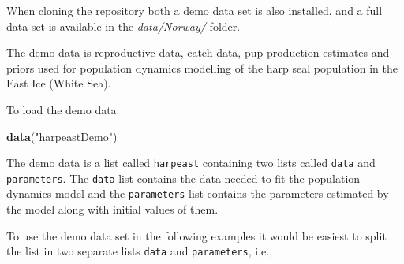 \documentclass[
]{article}
\newenvironment{Shaded}{\begin{snugshade}}{\end{snugshade}}
\newcommand{\CommentTok}[1]{\textcolor[rgb]{0.56,0.35,0.01}{\textit{#1}}}
\newcommand{\KeywordTok}[1]{\textcolor[rgb]{0.13,0.29,0.53}{\textbf{#1}}}
\newcommand{\NormalTok}[1]{#1}
\newcommand{\OperatorTok}[1]{\textcolor[rgb]{0.81,0.36,0.00}{\textbf{#1}}}
\newcommand{\StringTok}[1]{\textcolor[rgb]{0.31,0.60,0.02}{#1}}
\begin{document}
When cloning the repository both a demo data set is also installed, and
a full data set is available in the \emph{data/Norway/} folder.

The demo data is reproductive data, catch data, pup production estimates
and priors used for population dynamics modelling of the harp seal
population in the East Ice (White Sea).

To load the demo data:

\begin{Shaded}
\begin{Highlighting}[]
\KeywordTok{data}\NormalTok{(}\StringTok{"harpeastDemo"}\NormalTok{)}
\end{Highlighting}
\end{Shaded}

The demo data is a list called \texttt{harpeast} containing two lists
called \texttt{data} and \texttt{parameters}. The \texttt{data} list
contains the data needed to fit the population dynamics model and the
\texttt{parameters} list contains the parameters estimated by the model
along with initial values of them.

\begin{Shaded}
\end{Shaded}

To use the demo data set in the following examples it would be easiest
to split the list in two separate lists \texttt{data} and
\texttt{parameters}, i.e.,

\begin{Shaded}
\end{Shaded}
\end{document}

